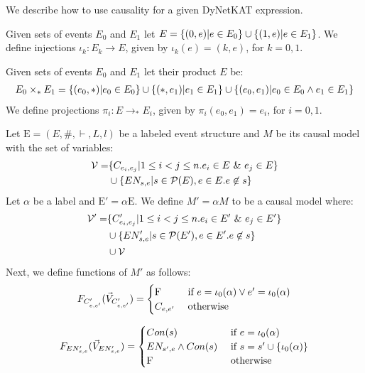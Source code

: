 We describe how to use causality for a given DyNetKAT expression.

\begin{definition}
    Given sets of events $E_0$ and $E_1$ let
    $E = \{(0,e)|e \in E_0\} \cup \{(1,e)|e \in E_1\}$.
    We define injections $\iota_k: E_k \rightarrow E$, given by
    $\iota_k(e) = (k,e)$, for $k = 0,1$.
\end{definition}

\begin{definition}
    Given sets of events $E_0$ and $E_1$ let their product $E$ be:
    \begin{align*}
        E_0 \times_* E_1 = \{(e_0,*)|e_0 \in E_0\} \cup \{(*,e_1)|e_1 \in E_1\}
        \cup \{(e_0,e_1)|e_0 \in E_0 \wedge e_1 \in E_1\}
    \end{align*}
    We define projections $\pi_i: E \rightarrow_* E_i$, given by
    $\pi_i(e_0,e_1) = e_i$, for $i=0,1$.
\end{definition}

\begin{definition}
    Let $\mathrm{E} = (E,\#,\vdash,L,l)$ be a labeled event structure and
    $M$ be its causal model with the set of variables:
    \begin{align*}
        \mathcal{V} = & \{C_{e_i,e_j} |  1 \leq i < j \leq n.
        e_i \in E \ \& \  e_j \in E\}                                \\
                      & \cup \{EN_{s,e} | s \in \mathcal{P}(E),
            e \in E. e \not \in s \}
    \end{align*}
    Let $\alpha$ be a label and $\mathrm{E'} = \alpha \mathrm{E}$.
    We define $M' = \alpha M$ to be a causal model where:
    \begin{align*}
        \mathcal{V'} = & \{C'_{e_i,e_j} |  1 \leq i < j \leq n.
        e_i \in E' \ \& \  e_j \in E'\}                                 \\
                       & \cup \{EN'_{s,e} | s \in \mathcal{P}(E'),
        e \in E'. e \not \in s \}                                    \\
                       & \cup \mathcal{V}
    \end{align*}
    Next, we define functions of $M'$ as follows:
    $$
        F_{C'_{e,e'}}(\vec V_{C'_{e,e'}}) = \begin{cases}
            \mathrm{F}       & \text{ if } e = \iota_0(\alpha) \vee e' = \iota_0(\alpha) \\
            C_{e,e'} & \text{ otherwise }
        \end{cases}
    $$

    $$
        F_{EN'_{s,e}}(\vec V_{EN'_{s,e}}) = \begin{cases}
            Con(s)                  & \text{ if } e = \iota_0(\alpha)             \\
            EN_{s',e} \wedge Con(s) & \text{ if } s = s' \cup \{\iota_0(\alpha)\} \\
            \mathrm{F}                      & \text{ otherwise }
        \end{cases}
    $$
\end{definition}


